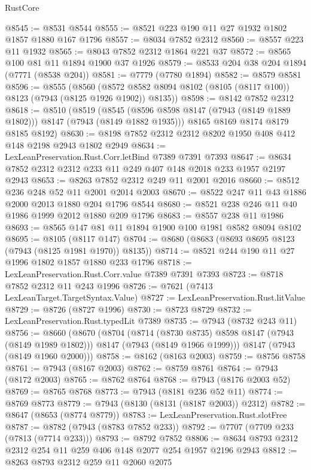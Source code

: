 \begin{lexlean}{RustCore}
\begin{coremodule}
@8545 := @8531 @8544
@8555 := @8521 @223 @190 @11 @27 @1932 @1802 @1857 @1880 @167 @1796
@8557 := @8034 @7852 @2312
@8560 := @8557 @223 @11 @1932
@8565 := @8043 @7852 @2312 @1864 @221 @37
@8572 := @8565 @100 @81 @11 @1894 @1900 @37 @1926
@8579 := @8533 @204 @38 @204 @1894 (@7771 (@8538 @204))
@8581 := @7779 (@7780 @1894)
@8582 := @8579 @8581
@8596 := @8555
    (@8560 (@8572 @8582 @8094 @8102 (@8105 (@8117 @100)) @8123 (@7943 (@8125 @1926 @1902)) @8135))
@8598 := @8142 @7852 @2312
@8618 := @8510
    (@8519
      (@8545 (@8596 @8598 @8147 (@7943 (@8149 @1889 @1802))) @8147 (@7943 (@8149 @1882 @1935)))
      @8165
      @8169
      @8174
      @8179
      @8185
      @8192)
@8630 := @8198 @7852 @2312 @2312 @8202 @1950 @408 @412 @148 @2198 @2943 @1802 @2949
@8634 := LexLeanPreservation.Rust.Corr.letBind @7389 @7391 @7393
@8647 := @8634 @7852 @2312 @2312 @233 @11 @249 @407 @148 @2018 @233 @1957 @2197 @2943
@8653 := @8263 @7852 @2312 @249 @11 @2001 @2016
@8660 := @8512 @236 @248 @52 @11 @2001 @2014 @2003
@8670 := @8522 @247 @11 @43 @1886 @2000 @2013 @1880 @204 @1796 @8544
@8680 := @8521 @238 @246 @11 @40 @1986 @1999 @2012 @1880 @209 @1796
@8683 := @8557 @238 @11 @1986
@8693 := @8565 @147 @81 @11 @1894 @1900 @100 @1981 @8582 @8094 @8102
@8695 := @8105 (@8117 @147)
@8704 := @8680 (@8683 (@8693 @8695 @8123 (@7943 (@8125 @1981 @1970)) @8135))
@8714 := @8521 @244 @190 @11 @27 @1996 @1802 @1857 @1880 @233 @1796
@8718 := LexLeanPreservation.Rust.Corr.value @7389 @7391 @7393
@8723 := @8718 @7852 @2312 @11 @243 @1996
@8726 := @7621 (@7413 LexLeanTarget.TargetSyntax.Value)
@8727 := LexLeanPreservation.Rust.litValue
@8729 := @8726 (@8727 @1996)
@8730 := @8723 @8729
@8732 := LexLeanPreservation.Rust.typedLit @7389
@8735 := @7943 (@8732 @243 @11)
@8756 := @8660
    (@8670
      (@8704
        (@8714 (@8730 @8735) @8598 @8147 (@7943 (@8149 @1989 @1802)))
        @8147
        (@7943 (@8149 @1966 @1999)))
      @8147
      (@7943 (@8149 @1960 @2000)))
@8758 := @8162 (@8163 @2003)
@8759 := @8756 @8758
@8761 := @7943 (@8167 @2003)
@8762 := @8759 @8761
@8764 := @7943 (@8172 @2003)
@8765 := @8762 @8764
@8768 := @7943 (@8176 @2003 @52)
@8769 := @8765 @8768
@8773 := @7943 (@8181 @236 @52 @11)
@8774 := @8769 @8773
@8779 := @7943 (@8130 (@8131 (@8187 @2003)) @2312)
@8782 := @8647 (@8653 (@8774 @8779))
@8783 := LexLeanPreservation.Rust.slotFree
@8787 := @8782 (@7943 (@8783 @7852 @233))
@8792 := @7707 (@7709 @233 (@7813 (@7714 @233)))
@8793 := @8792 @7852
@8806 := @8634 @8793 @2312 @2312 @254 @11 @259 @406 @148 @2077 @254 @1957 @2196 @2943
@8812 := @8263 @8793 @2312 @259 @11 @2060 @2075

\end{coremodule}
\end{lexlean}
